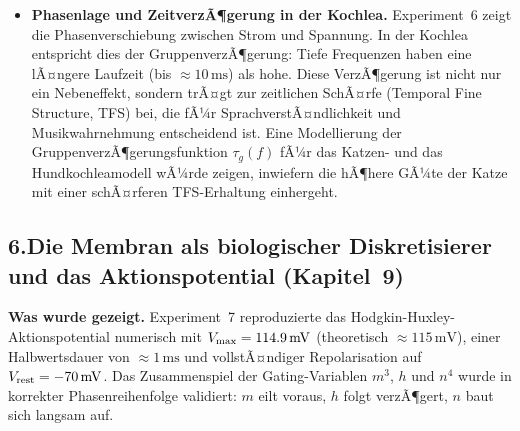 ﻿\documentclass[12pt,a4paper,titlepage]{report}
\begin{document}
\begin{itemize}[leftmargin=2em]
    Das tatsÃ¤chliche Mittelohr erreicht eine Anpassung auf $< 1\,\mathrm{dB}$.
    Das optimale Impedanzanpassungs-Design (Hebelarm + FlÃ¤chenverhÃ¤ltnis)
    aus Sicht der Informationstheorie â€” Maximierung der KanalkapazitÃ¤t
    bei minimalem mechanischen Energieverlust â€” wÃ¤re ein direktes
    BindestÃ¼ck zwischen Kapitel~5 und Kapitel~6.
  \item \textbf{Phasenlage und ZeitverzÃ¶gerung in der Kochlea.}
    Experiment~6 zeigt die Phasenverschiebung zwischen Strom und Spannung.
    In der Kochlea entspricht dies der Gruppenver\-zÃ¶gerung:
    Tiefe Frequenzen haben eine lÃ¤ngere Laufzeit (bis $\approx 10\,\mathrm{ms}$)
    als hohe.
    Diese VerzÃ¶gerung ist nicht nur ein Nebeneffekt, sondern
    trÃ¤gt zur zeitlichen SchÃ¤rfe (Temporal Fine Structure, TFS) bei,
    die fÃ¼r SprachverstÃ¤ndlichkeit und Musikwahrnehmung entscheidend ist.
    Eine Modellierung der Gruppenver\-zÃ¶gerungsfunktion $\tau_g(f)$
    fÃ¼r das Katzen- und das Hundkochleamodell wÃ¼rde zeigen,
    inwiefern die hÃ¶here GÃ¼te der Katze mit einer schÃ¤rferen
    TFS-Erhaltung einhergeht.
\end{itemize}

\subsection*{6.\enspace Die Membran als biologischer Diskretisierer
und das Aktionspotential (Kapitel~9)}

\textbf{Was wurde gezeigt.}
Experiment~7 reproduzierte das Hodgkin-Huxley-Aktionspotential numerisch
mit $V_{\max}=\SI{114{,}9}{\milli\volt}$ (theoretisch $\approx 115\,\mathrm{mV}$),
einer Halbwertsdauer von $\approx 1\,\mathrm{ms}$ und vollstÃ¤ndiger
Repolarisation auf $V_{\rm rest}=-70\,\mathrm{mV}$.
Das Zusammenspiel der Gating-Variablen $m^3$, $h$ und $n^4$ wurde
in korrekter Phasenreihenfolge validiert: $m$ eilt voraus, $h$ folgt
verzÃ¶gert, $n$ baut sich langsam auf.
\end{document}
